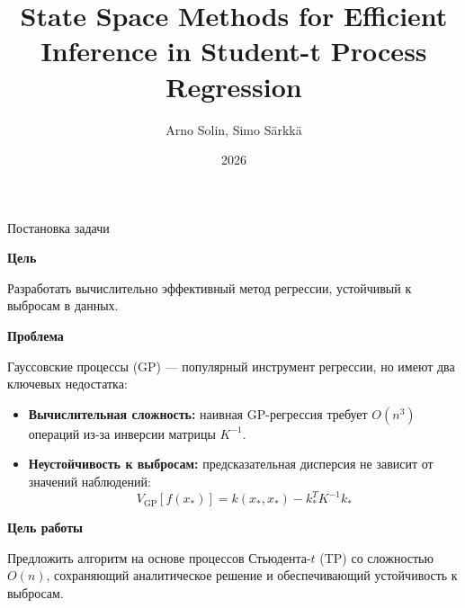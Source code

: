 \documentclass{beamer}
\title[Научно-исследовательская работа]
{State Space Methods for Efficient Inference in Student-t Process Regression}
\author[]{
    Arno Solin, Simo S\"arkk\"a
}
\institute[]{
}
\date{2026}
\begin{document}

\begin{frame}
    \thispagestyle{empty}
    \maketitle
\end{frame}


\begin{frame}{Постановка задачи}

{\small
\textbf{Цель}

Разработать вычислительно эффективный метод регрессии, устойчивый к выбросам в данных.

\vspace{5pt}

\textbf{Проблема}

Гауссовские процессы (GP) --- популярный инструмент регрессии, но имеют два ключевых недостатка:
\begin{itemize}
    \item \textbf{Вычислительная сложность:} наивная GP-регрессия требует $O(n^3)$ операций из-за инверсии матрицы $K^{-1}$.
    \item \textbf{Неустойчивость к выбросам:} предсказательная дисперсия не зависит от значений наблюдений:
    \[
        V_{\mathrm{GP}}[f(x_*)] = k(x_*,x_*) - k_*^T K^{-1} k_*
    \]
\end{itemize}

\vspace{5pt}

\textbf{Цель работы}

Предложить алгоритм на основе процессов Стьюдента-$t$ (TP) со сложностью $O(n)$, сохраняющий аналитическое решение и обеспечивающий устойчивость к выбросам.
}

\end{frame}

\end{document}
